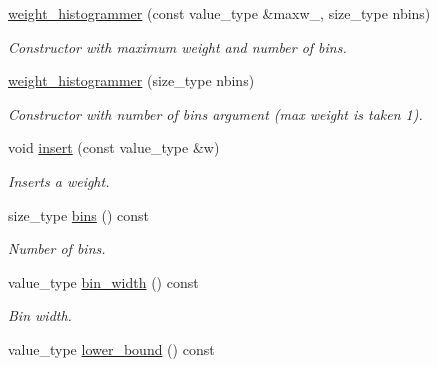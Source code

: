 \begin{DoxyCompactItemize}
\item 
\hypertarget{a00596_a9c9e10ca93b4c307c3c4cbafd5492efd}{}\hyperlink{a00596_a9c9e10ca93b4c307c3c4cbafd5492efd}{weight\+\_\+histogrammer} (const value\+\_\+type \&maxw\+\_\+, size\+\_\+type nbins)\label{a00596_a9c9e10ca93b4c307c3c4cbafd5492efd}

\begin{DoxyCompactList}\small\item\em Constructor with maximum weight and number of bins. \end{DoxyCompactList}\item 
\hypertarget{a00596_adcbbe7cf56320b7404b7cb54d70b15f1}{}\hyperlink{a00596_adcbbe7cf56320b7404b7cb54d70b15f1}{weight\+\_\+histogrammer} (size\+\_\+type nbins)\label{a00596_adcbbe7cf56320b7404b7cb54d70b15f1}

\begin{DoxyCompactList}\small\item\em Constructor with number of bins argument (max weight is taken 1). \end{DoxyCompactList}\item 
void \hyperlink{a00596_ae200d4ddb19e3533d041880372a3bb65}{insert} (const value\+\_\+type \&w)
\begin{DoxyCompactList}\small\item\em Inserts a weight. \end{DoxyCompactList}\item 
\hypertarget{a00596_a25544e42f597dc9e756bcff1f0a36eea}{}size\+\_\+type \hyperlink{a00596_a25544e42f597dc9e756bcff1f0a36eea}{bins} () const \label{a00596_a25544e42f597dc9e756bcff1f0a36eea}

\begin{DoxyCompactList}\small\item\em Number of bins. \end{DoxyCompactList}\item 
\hypertarget{a00596_ad8c1d28bce5747b90651f01801460904}{}value\+\_\+type \hyperlink{a00596_ad8c1d28bce5747b90651f01801460904}{bin\+\_\+width} () const \label{a00596_ad8c1d28bce5747b90651f01801460904}

\begin{DoxyCompactList}\small\item\em Bin width. \end{DoxyCompactList}\item 
\hypertarget{a00596_a1da0126269357ccb03857e8f385363a3}{}value\+\_\+type \hyperlink{a00596_a1da0126269357ccb03857e8f385363a3}{lower\+\_\+bound} () const \label{a00596_a1da0126269357ccb03857e8f385363a3}


\end{DoxyCompactItemize}
